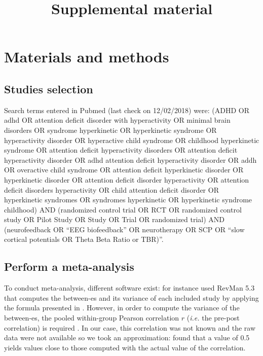 \documentclass[12pt,a4paper,english]{article}
\begin{document}
\title{Supplemental material}
\date{}
\maketitle

\section{Materials and methods}

\subsection{Studies selection}

Search terms entered in Pubmed (last check on 12/02/2018) were: 
\guillemotleft (ADHD OR adhd OR attention deficit disorder with hyperactivity OR minimal brain disorders OR syndrome hyperkinetic 
OR hyperkinetic syndrome OR hyperactivity disorder OR hyperactive child syndrome OR childhood hyperkinetic syndrome 
OR attention deficit hyperactivity disorders OR attention deficit hyperactivity disorder OR adhd attention deficit hyperactivity disorder 
OR addh OR overactive child syndrome OR attention deficit hyperkinetic disorder OR hyperkinetic disorder 
OR attention deficit disorder hyperactivity OR attention deficit disorders hyperactivity OR child attention deficit disorder 
OR hyperkinetic syndromes OR syndromes hyperkinetic OR hyperkinetic syndrome childhood) 
AND (randomized control trial OR RCT OR randomized control study OR Pilot Study OR Study OR Trial OR randomized trial) 
AND (neurofeedback OR “EEG biofeedback” OR neurotherapy OR SCP OR “slow cortical potentials OR Theta Beta Ratio or TBR)”\guillemotright.


\subsection{Perform a meta-analysis}

To conduct meta-analysis, different software exist: for instance \citet{Cortese2016} used RevMan 5.3 \citep{RevMan} that computes the between-\gls{es} and its 
variance of each included study by applying the formula presented in \citet{Morris2008}. However, in order to compute the variance of the between-\gls{es}, 
the pooled within-group Pearson correlation $r$ (\textit{i.e.} the pre-post correlation) is required 
\citep{James2013}. In our case, this correlation was not known and the raw data were not available so we took an
 approximation: \citet{Balk2012} found that a value of 0.5 yields values close to those computed with the actual value of the correlation. 
\end{document}
